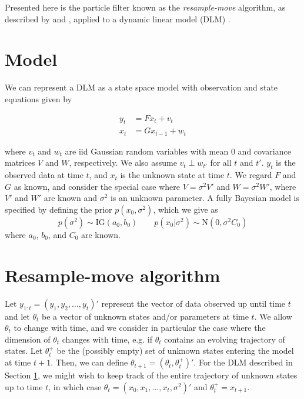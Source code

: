 \documentclass{article}
\begin{document}
Presented here is the particle filter known as the \emph{resample-move} algorithm, as described by \citet{Gilk:Berz:foll:2001} and \citet{Berz:gilk:2001}, applied to a dynamic linear model (DLM) \citep{petris2009dynamic}.

\section{Model} \label{sec:model}

We can represent a DLM as a state space model with observation and state equations given by

\begin{align}
y_t &= Fx_t + v_t \label{eqn:obs} \\
x_t &= Gx_{t-1} + w_t \label{eqn:state}
\end{align}

\noindent where $v_t$ and $w_t$ are iid Gaussian random variables with mean 0 and covariance matrices $V$ and $W$, respectively. We also assume $v_t \perp w_{t'}$ for all $t$ and $t'$. $y_t$ is the observed data at time $t$, and $x_t$ is the unknown state at time $t$. We regard $F$ and $G$ as known, and consider the special case where $V = \sigma^2V'$ and $W = \sigma^2W'$, where $V'$ and $W'$ are known and $\sigma^2$ is an unknown parameter. A fully Bayesian model is specified by defining the prior $p(x_0,\sigma^2)$, which we give as \[p(\sigma^2) \sim \mbox{IG}(a_0,b_0) \qquad p(x_0|\sigma^2) \sim \mbox{N}(0,\sigma^2C_0)\]
\noindent where $a_0$, $b_0$, and $C_0$ are known.

\section{Resample-move algorithm} \label{sec:rm}

Let $y_{1:t} = (y_1,y_2,\ldots,y_t)'$ represent the vector of data observed up until time $t$ and let $\theta_t$ be a vector of unknown states and/or parameters at time $t$. We allow $\theta_t$ to change with time, and we consider in particular the case where the dimension of $\theta_t$ changes with time, e.g. if $\theta_t$ contains an evolving trajectory of states. Let $\theta^{+}_t$ be the (possibly empty) set of unknown states entering the model at time $t+1$. Then, we can define $\theta_{t+1} = (\theta_t,\theta^{+}_t)'$. For the DLM described in Section \ref{sec:model}, we might wish to keep track of the entire trajectory of unknown states up to time $t$, in which case $\theta_t = (x_0,x_1,\ldots,x_t,\sigma^2)'$ and $\theta^{+}_t = x_{t+1}$.
\end{document}
